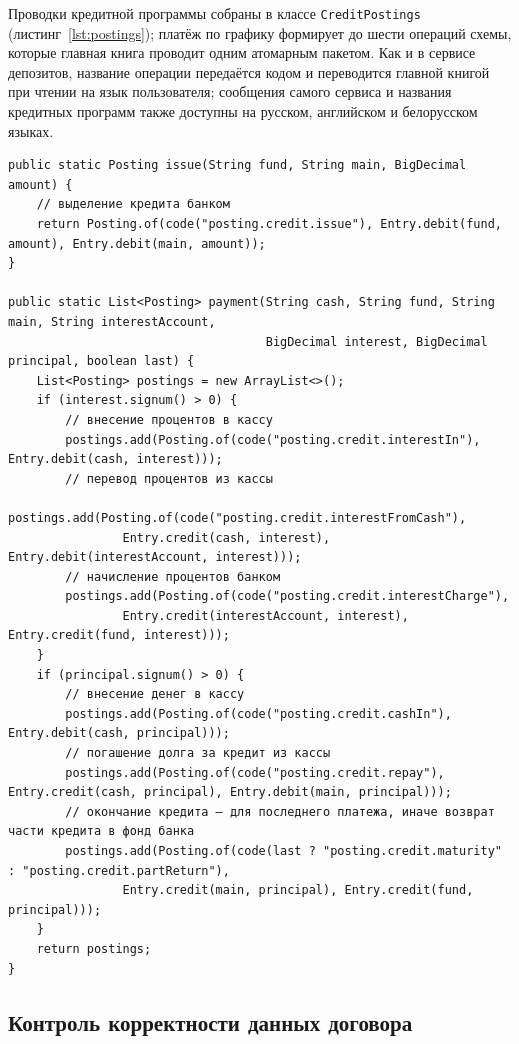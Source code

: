\documentclass[14pt,a4paper]{extarticle}
\begin{document}
Проводки кредитной программы собраны в классе \texttt{CreditPostings}
(листинг~\ref{lst:postings}); платёж по графику формирует до шести операций схемы, которые
главная книга проводит одним атомарным пакетом. Как и в сервисе депозитов, название операции
передаётся кодом и переводится главной книгой при чтении на язык пользователя; сообщения
самого сервиса и названия кредитных программ также доступны на русском, английском и
белорусском языках.

\begin{lstlisting}[style=java, caption={Проводки выдачи кредита и платежа по графику (\texttt{CreditPostings})}, label={lst:postings}]
public static Posting issue(String fund, String main, BigDecimal amount) {
    // выделение кредита банком
    return Posting.of(code("posting.credit.issue"), Entry.debit(fund, amount), Entry.debit(main, amount));
}

public static List<Posting> payment(String cash, String fund, String main, String interestAccount,
                                    BigDecimal interest, BigDecimal principal, boolean last) {
    List<Posting> postings = new ArrayList<>();
    if (interest.signum() > 0) {
        // внесение процентов в кассу
        postings.add(Posting.of(code("posting.credit.interestIn"), Entry.debit(cash, interest)));
        // перевод процентов из кассы
        postings.add(Posting.of(code("posting.credit.interestFromCash"),
                Entry.credit(cash, interest), Entry.debit(interestAccount, interest)));
        // начисление процентов банком
        postings.add(Posting.of(code("posting.credit.interestCharge"),
                Entry.credit(interestAccount, interest), Entry.credit(fund, interest)));
    }
    if (principal.signum() > 0) {
        // внесение денег в кассу
        postings.add(Posting.of(code("posting.credit.cashIn"), Entry.debit(cash, principal)));
        // погашение долга за кредит из кассы
        postings.add(Posting.of(code("posting.credit.repay"), Entry.credit(cash, principal), Entry.debit(main, principal)));
        // окончание кредита — для последнего платежа, иначе возврат части кредита в фонд банка
        postings.add(Posting.of(code(last ? "posting.credit.maturity" : "posting.credit.partReturn"),
                Entry.credit(main, principal), Entry.credit(fund, principal)));
    }
    return postings;
}
\end{lstlisting}

\subsection{Контроль корректности данных договора}
\end{document}
